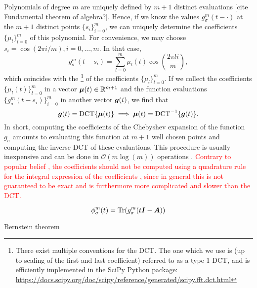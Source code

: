 Polynomials of degree $m$ are uniquely defined by $m+1$ distinct evaluations [cite Fundamental theorem of algebra?].
Hence, if we know the values $g_{\sigma}^m(t - \cdot)$ at the $m+1$ distinct points 
$\{s_i\}_{i=0}^m$, we can uniquely determine the coefficients $\{\mu_l\}_{l=0}^m$
of this polynomial. For convenience, we may choose $s_i = \cos(2 \pi i/m), i=0,\dots,m$.
In that case,
\begin{equation}
    g_{\sigma}^m(t - s_i) = \sum_{l=0}^{m} \mu_l(t) \cos\left(\frac{2 \pi l i}{m}\right),
    \label{equ:2-chebyshev-chebyshev-nodes-evaluation}
\end{equation}
which coincides with the \footnote{There exist multiple conventions for the DCT.
The one which we use is (up to scaling of the first and last coefficient)
referred to as a type 1 DCT, and is efficiently implemented in the SciPy Python package:
\url{https://docs.scipy.org/doc/scipy/reference/generated/scipy.fft.dct.html}} of the coefficients $\{\mu_l\}_{l=0}^m$.
If we collect the coefficients $\{\mu_l(t)\}_{l=0}^{m}$ in a vector $\boldsymbol{\mu}(t) \in \mathbb{R}^{m+1}$ 
and the function evaluations $\{g_{\sigma}^m(t - s_i)\}_{i=0}^{m}$ in another
vector $\boldsymbol{g}(t)$, we find that
\begin{equation}
    \boldsymbol{g}(t) = \operatorname{DCT} \{ \boldsymbol{\mu}(t) \} \implies \boldsymbol{\mu}(t) = \operatorname{DCT}^{-1}\{ \boldsymbol{g}(t) \}.
    \label{equ:2-chebyshev-chebyshev-DCT}
\end{equation}
In short, computing the coefficients of the Chebyshev expansion 
of the function $g_{\sigma}$ amounts to evaluating this function at $m+1$ well
chosen points and computing the inverse \gls{DCT} of these evaluations. 
This procedure is usually inexpensive and can be done in $\mathcal{O}(m \log(m))$
operations \cite{makhoul1980fct}.
\textcolor{red}{Contrary to popular belief \cite[Algorithm~1]{lin2017randomized},
the coefficients should not be computed using a quadrature rule for the integral
expression of the coefficients \cite[Theorem~3.1]{trefethen2019chebyshev}, since
in general this is not guaranteed to be exact and is furthermore more complicated
and slower than the \gls{DCT}.}

\begin{equation}
    \phi_{\sigma}^m(t) = \operatorname{Tr}(g_{\sigma}^m(t\boldsymbol{I} - \boldsymbol{A}))
    \label{equ:2-chebyshev-DGC-spectral-density-chebyshev-expansion}
\end{equation}

Bernstein theorem \cite[Theorem~73]{meinardus1967approximation} 

